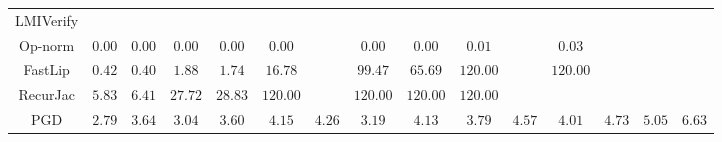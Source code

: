 \begin{table*}
{\begin{tabular}{c|c|c|c|c|c|c|c|c|c|c|c|c|c|c}
    LMIVerify &               &               &               &               &               &               &               &               &               &               &               &               &               &               \\
      Op-norm &        $0.00$ &        $0.00$ &        $0.00$ &        $0.00$ &        $0.00$ &               &        $0.00$ &        $0.00$ &        $0.01$ &               &        $0.03$ &               &               &               \\
      FastLip &        $0.42$ &        $0.40$ &        $1.88$ &        $1.74$ &       $16.78$ &               &       $99.47$ &       $65.69$ &      $120.00$ &               &      $120.00$ &               &               &               \\
     RecurJac &        $5.83$ &        $6.41$ &       $27.72$ &       $28.83$ &      $120.00$ &               &      $120.00$ &      $120.00$ &      $120.00$ &               &               &               &               &               \\
\hline
          PGD &        $2.79$ &        $3.64$ &        $3.04$ &        $3.60$ &        $4.15$ &        $4.26$ &        $3.19$ &        $4.13$ &        $3.79$ &        $4.57$ &        $4.01$ &        $4.73$ &        $5.05$ &        $6.63$ \\

    \bottomrule
    \end{tabular}
    \label{table:exp-A-average-radius-time-cifar10-2}
    }
\end{table*}
        


